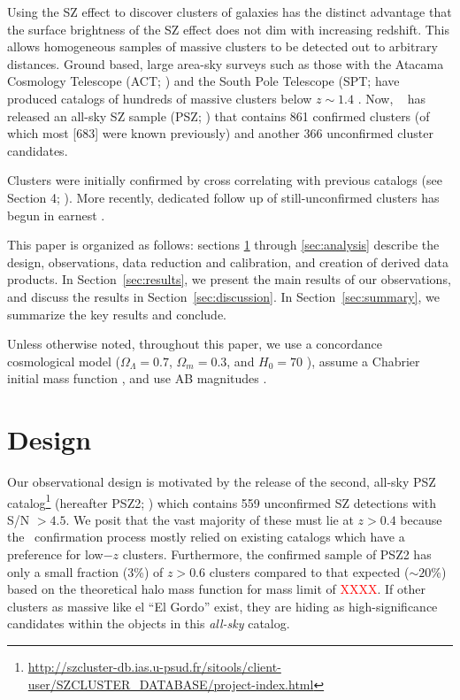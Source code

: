 \documentclass[apj, revtex4-1]{emulateapj}
\newcommand{\editorial}[1]{\textcolor{red}{#1}}
\begin{document}
Using the SZ effect to discover clusters of galaxies has the distinct advantage that the surface brightness of the SZ effect does not dim with increasing redshift. This allows homogeneous samples of massive clusters to be detected out to arbitrary distances. Ground based, large area-sky surveys such as those with the Atacama Cosmology Telescope (ACT; \citealt{Swetz2011}) and the South Pole Telescope (SPT; \citealt{Carlstrom2011} have produced catalogs of hundreds of massive clusters below $z \sim 1.4$ . Now, \planck\ \citep{Tauber2010, PlanckCollaboration2011} has released an all-sky SZ sample (PSZ; \citealt{PlanckCollaboration2014, PlanckCollaboration2015}) that contains 861 confirmed clusters (of which most [683] were known previously) and another 366 unconfirmed cluster candidates.

Clusters were initially confirmed by cross correlating with previous catalogs (see Section 4; \citealt{PlanckCollaboration2014}). More recently, dedicated follow up of still-unconfirmed clusters has begun in earnest .

This paper is organized as follows: sections \ref{sec:design} through \ref{sec:analysis} describe the design, observations, data reduction and calibration, and creation of derived data products. In Section~\ref{sec:results}, we present the main results of our observations, and discuss the results in Section~\ref{sec:discussion}. In Section~\ref{sec:summary}, we summarize the key results and conclude.

Unless otherwise noted, throughout this paper, we use a concordance cosmological model ($\Omega_\Lambda = 0.7$, $\Omega_m = 0.3$, and $H_0= 70$ \kms \permpc), assume a Chabrier initial mass function \citep{Chabrier2003}, and use AB magnitudes \citep{Oke1974}.

\section{Design}\label{sec:design}
Our observational design is motivated by the release of the second, all-sky PSZ catalog\footnote{\url{http://szcluster-db.ias.u-psud.fr/sitools/client-user/SZCLUSTER_DATABASE/project-index.html}} (hereafter PSZ2; \citealt{PlanckCollaboration2015}) which contains 559 unconfirmed SZ detections with S/N $> 4.5$. We posit that the vast
majority of these must lie at $z>0.4$ because the \planck\ confirmation process \citep{PlanckCollaboration2014} mostly relied on existing catalogs which have a preference for low$-z$ clusters. Furthermore, the confirmed sample of PSZ2 has only a small fraction (3\%) of $z > 0.6$ clusters compared to that expected ($\sim20$\%) based on the theoretical halo mass function  for mass limit of \editorial{XXXX}. If other clusters as massive like el ``El Gordo'' exist, they are hiding as high-significance candidates within the objects in this {\it all-sky} catalog.
\end{document}
